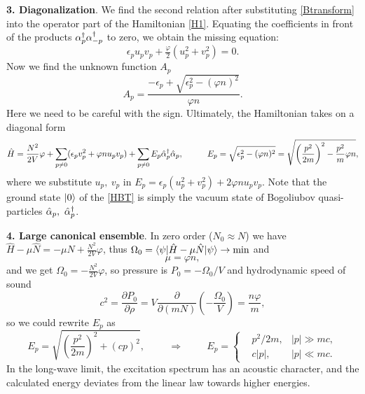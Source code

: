\textbf{3. Diagonalization}. We find the second relation after substituting \eqref{Btransform} into the operator part of the Hamiltonian \eqref{H1}. Equating the coefficients in front of the products $\alpha_p^{\dag} \alpha_{-p}^{\dag}$ to zero, we obtain the missing equation:
\begin{equation*}
	\epsilon_p u_p v_p + \tfrac{\varphi}{2} (u_p^2 + v_p^2) = 0.
\end{equation*}
Now we find the unknown function $A_p$
\begin{equation}
	A_p = \frac{-\epsilon_p + \sqrt{\epsilon_p^2-(\varphi n)^2}}{\varphi n}.
	\label{Ap}
\end{equation}
Here we need to be careful with the sign. Ultimately, the Hamiltonian takes on a diagonal form
\begin{equation}
	\hat{H} = \frac{N^2}{2V}\varphi + \sum_{p \neq 0} (\epsilon_p v_p^2 + \varphi n u_p v_p) + \sum_{p \neq 0} E_p \hat{\alpha}\D_p \hat{\alpha}_p,
	\hspace{10 mm} 
	E_p = \sqrt{\epsilon_p^2 - (\varphi n)^2} = \sqrt{\left(\frac{p^2}{2m}\right)^2 - \frac{p^2}{m} \varphi n},
	\label{HBT}
\end{equation}
where we substitute $u_p,\ v_p$ in  $E_p = \epsilon_p (u_p^2 + v_p^2) + 2 \varphi n u_p v_p$. Note that the ground state $\left| 0 \right\rangle$ of the \eqref{HBT} is simply the vacuum state of Bogoliubov quasi-particles $\hat{\alpha}_p,\ \hat{\alpha}_p\D$.


\textbf{4. Large canonical ensemble}. In zero order ($N_0 \approx N$) we have $\hat{H} - \mu \hat{N} = - \mu N + \frac{N^2}{2V}\varphi$, thus $\Omega_0 = \bk{\psi}[\hat{H}- \mu \hat{N}]{\psi} \to \min$ and 
\begin{equation*}
	\mu = \varphi n,
\end{equation*}
and we get $\Omega_0 = - \frac{N^2}{2V} \varphi$, so pressure is $P_0 = - \Omega_0 /V$ and hydrodynamic speed of sound
\begin{equation*}
	c^2 = \frac{\partial P_0}{\partial \rho} = V \frac{\partial }{\partial (m N)} \left(- \frac{\Omega_0}{V}\right) = \frac{n \varphi}{m},
\end{equation*}
so we could  rewrite $E_p$ as
\begin{equation}
	E_p = \sqrt{\left(\frac{p^2}{2m}\right)^2 + (cp)^2},
	\hspace{1cm} \Rightarrow \hspace{1cm}
	E_p = \left\{\begin{aligned}
	    &p^2 / 2m, &|p| \gg mc, \\
	    &c |p| , &|p| \ll mc.
	\end{aligned}\right.
\end{equation}
In the long-wave limit, the excitation spectrum has an acoustic character, and the calculated energy deviates from the linear law towards higher energies.



